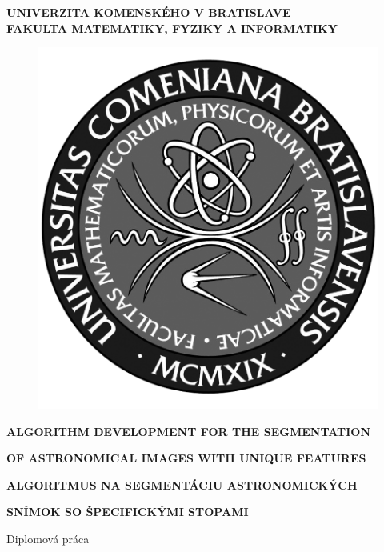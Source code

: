 \documentclass[12pt, a4paper, oneside]{book}
\newcommand\mfthesistype{Diplomová práca}
\newcommand\mfuniversity{UNIVERZITA KOMENSKÉHO V BRATISLAVE}
\newcommand\mffaculty{FAKULTA MATEMATIKY, FYZIKY A INFORMATIKY}
\begin{document}

\noindent
\begin{minipage}{\textwidth}
\begin{center}
\textbf{\mfuniversity \\
\mffaculty}
\end{center}
\end{minipage}

\vfill
\begin{figure}[!hbt]
\begin{center}
\includegraphics{images/logo_fmph_dark}
\label{img:logo_dark}
\end{center}
\end{figure}
\begin{center}
\begin{minipage}{0.8\textwidth}
        \centerline{\textbf{\Large\MakeUppercase{Algorithm development for the segmentation}}}
        \centerline{\textbf{\Large\MakeUppercase{of astronomical images with unique features}}}
        \smallskip
        \smallskip
        \smallskip
        \smallskip
        \centerline{\textbf{\Large\MakeUppercase{Algoritmus na segmentáciu astronomických}}}
        \centerline{\textbf{\Large\MakeUppercase{snímok so špecifickými stopami}}}
        \smallskip
\smallskip
\centerline{\mfthesistype}
\end{minipage}
\end{center}
\end{document}
